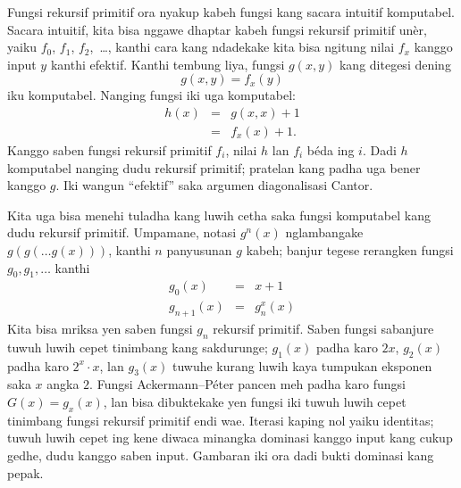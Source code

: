 \documentclass[../../../include/open-logic-section]{subfiles}
\begin{document}

Fungsi rekursif primitif ora nyakup kabeh fungsi
kang sacara intuitif komputabel. Sacara intuitif,
kita bisa nggawe dhaptar kabeh fungsi rekursif
primitif unèr, yaiku $f_0$, $f_1$, $f_2$,~\dots,
kanthi cara kang ndadekake kita bisa ngitung nilai
$f_x$ kanggo input $y$ kanthi efektif. Kanthi
tembung liya, fungsi $g(x,y)$ kang ditegesi dening
\[
g(x,y) = f_x(y)
\]
iku komputabel. Nanging fungsi iki uga komputabel:
\begin{eqnarray*}
h(x) & = & g(x,x) + 1 \\
& = & f_x(x) +1.
\end{eqnarray*}
Kanggo saben fungsi rekursif primitif $f_i$,
nilai $h$ lan $f_i$ béda ing $i$. Dadi $h$
komputabel nanging dudu rekursif primitif;
pratelan kang padha uga bener kanggo $g$.
Iki wangun ``efektif'' saka argumen
diagonalisasi Cantor.

Kita uga bisa menehi tuladha kang luwih cetha
saka fungsi komputabel kang dudu rekursif
primitif. Umpamane, notasi $g^n(x)$ nglambangake
$g(g(\dots g(x)))$, kanthi $n$ panyusunan
$g$ kabeh; banjur tegese rerangken fungsi
$g_0,g_1,\dots$ kanthi
\begin{eqnarray*}
g_0(x) & = & x+1 \\
g_{n + 1}(x) & = & g_n^x(x)
\end{eqnarray*}
Kita bisa mriksa yen saben fungsi $g_n$
rekursif primitif. Saben fungsi sabanjure
tuwuh luwih cepet tinimbang kang sakdurunge;
$g_1(x)$ padha karo $2x$, $g_2(x)$ padha
karo $2^x \cdot x$, lan $g_3(x)$ tuwuhe
kurang luwih kaya tumpukan eksponen saka
$x$ angka $2$. Fungsi Ackermann--P\'eter
pancen meh padha karo fungsi $G(x) = g_x(x)$,
lan bisa dibuktekake yen fungsi iki tuwuh
luwih cepet tinimbang fungsi rekursif
primitif endi wae. Iterasi kaping nol yaiku identitas; tuwuh luwih cepet ing kene diwaca minangka dominasi kanggo input kang cukup gedhe, dudu kanggo saben input. Gambaran iki ora dadi bukti dominasi kang pepak.
\end{document}
